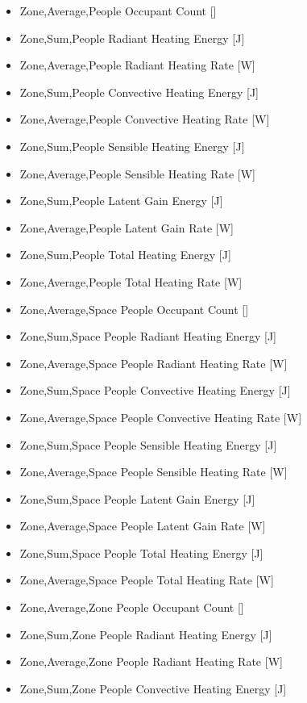 \begin{itemize}
\item
  Zone,Average,People Occupant Count {[]}
\item
  Zone,Sum,People Radiant Heating Energy {[}J{]}
\item
  Zone,Average,People Radiant Heating Rate {[}W{]}
\item
  Zone,Sum,People Convective Heating Energy {[}J{]}
\item
  Zone,Average,People Convective Heating Rate {[}W{]}
\item
  Zone,Sum,People Sensible Heating Energy {[}J{]}
\item
  Zone,Average,People Sensible Heating Rate {[}W{]}
\item
  Zone,Sum,People Latent Gain Energy {[}J{]}
\item
  Zone,Average,People Latent Gain Rate {[}W{]}
\item
  Zone,Sum,People Total Heating Energy {[}J{]}
\item
  Zone,Average,People Total Heating Rate {[}W{]}
\item
  Zone,Average,Space People Occupant Count {[]}
\item
  Zone,Sum,Space People Radiant Heating Energy {[}J{]}
\item
  Zone,Average,Space People Radiant Heating Rate {[}W{]}
\item
  Zone,Sum,Space People Convective Heating Energy {[}J{]}
\item
  Zone,Average,Space People Convective Heating Rate {[}W{]}
\item
  Zone,Sum,Space People Sensible Heating Energy {[}J{]}
\item
  Zone,Average,Space People Sensible Heating Rate {[}W{]}
\item
  Zone,Sum,Space People Latent Gain Energy {[}J{]}
\item
  Zone,Average,Space People Latent Gain Rate {[}W{]}
\item
  Zone,Sum,Space People Total Heating Energy {[}J{]}
\item
  Zone,Average,Space People Total Heating Rate {[}W{]}
\item
  Zone,Average,Zone People Occupant Count {[]}
\item
  Zone,Sum,Zone People Radiant Heating Energy {[}J{]}
\item
  Zone,Average,Zone People Radiant Heating Rate {[}W{]}
\item
  Zone,Sum,Zone People Convective Heating Energy {[}J{]}

\end{itemize}
